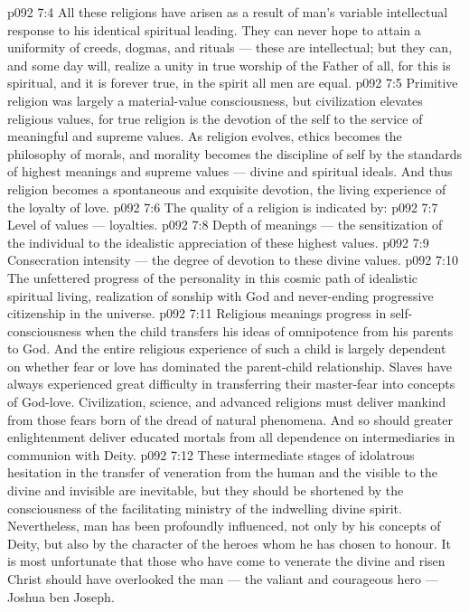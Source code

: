 \vs p092 7:4 All these religions have arisen as a result of man’s variable intellectual response to his identical spiritual leading. They can never hope to attain a uniformity of creeds, dogmas, and rituals --- these are intellectual; but they can, and some day will, realize a unity in true worship of the Father of all, for this is spiritual, and it is forever true, in the spirit all men are equal.
\vs p092 7:5 \pc Primitive religion was largely a material\hyp{}value consciousness, but civilization elevates religious values, for true religion is the devotion of the self to the service of meaningful and supreme values. As religion evolves, ethics becomes the philosophy of morals, and morality becomes the discipline of self by the standards of highest meanings and supreme values --- divine and spiritual ideals. And thus religion becomes a spontaneous and exquisite devotion, the living experience of the loyalty of love.
\vs p092 7:6 The quality of a religion is indicated by:
\vs p092 7:7 \bibnobreakspace Level of values --- loyalties.
\vs p092 7:8 \bibnobreakspace Depth of meanings --- the sensitization of the individual to the idealistic appreciation of these highest values.
\vs p092 7:9 \bibnobreakspace Consecration intensity --- the degree of devotion to these divine values.
\vs p092 7:10 \bibnobreakspace The unfettered progress of the personality in this cosmic path of idealistic spiritual living, realization of sonship with God and never\hyp{}ending progressive citizenship in the universe.
\vs p092 7:11 \pc Religious meanings progress in self\hyp{}consciousness when the child transfers his ideas of omnipotence from his parents to God. And the entire religious experience of such a child is largely dependent on whether fear or love has dominated the parent\hyp{}child relationship. Slaves have always experienced great difficulty in transferring their master\hyp{}fear into concepts of God\hyp{}love. Civilization, science, and advanced religions must deliver mankind from those fears born of the dread of natural phenomena. And so should greater enlightenment deliver educated mortals from all dependence on intermediaries in communion with Deity.
\vs p092 7:12 These intermediate stages of idolatrous hesitation in the transfer of veneration from the human and the visible to the divine and invisible are inevitable, but they should be shortened by the consciousness of the facilitating ministry of the indwelling divine spirit. Nevertheless, man has been profoundly influenced, not only by his concepts of Deity, but also by the character of the heroes whom he has chosen to honour. It is most unfortunate that those who have come to venerate the divine and risen Christ should have overlooked the man --- the valiant and courageous hero --- Joshua ben Joseph.
